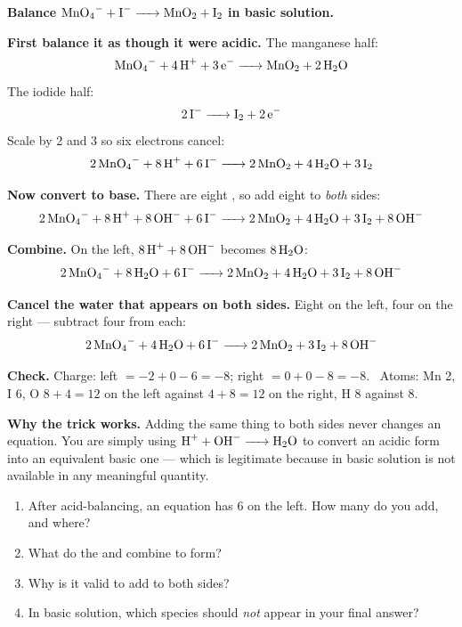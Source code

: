 \documentclass{apchem-worksheet}
\begin{document}
\begin{workedexample}
\textbf{Balance $\ce{MnO4- + I- -> MnO2 + I2}$ in basic solution.}

\textbf{First balance it as though it were acidic.} The manganese half:
\[ \ce{MnO4- + 4H+ + 3e- -> MnO2 + 2H2O} \]
The iodide half:
\[ \ce{2I- -> I2 + 2e-} \]
Scale by 2 and 3 so six electrons cancel:
\[ \ce{2MnO4- + 8H+ + 6I- -> 2MnO2 + 4H2O + 3I2} \]

\textbf{Now convert to base.} There are eight , so add eight
 to \emph{both} sides:
\[ \ce{2MnO4- + 8H+ + 8OH- + 6I- -> 2MnO2 + 4H2O + 3I2 + 8OH-} \]

\textbf{Combine.} On the left, $\ce{8H+ + 8OH-}$ becomes
$\ce{8H2O}$:
\[ \ce{2MnO4- + 8H2O + 6I- -> 2MnO2 + 4H2O + 3I2 + 8OH-} \]

\textbf{Cancel the water that appears on both sides.} Eight on the
left, four on the right --- subtract four from each:
\[ \ce{2MnO4- + 4H2O + 6I- -> 2MnO2 + 3I2 + 8OH-} \]

\textbf{Check.} Charge: left $= -2 + 0 - 6 = -8$; right $= 0 + 0 - 8 =
-8$. \checkmark\ Atoms: Mn 2, I 6, O $8+4 = 12$ on the left against
$4 + 8 = 12$ on the right, H 8 against 8. \checkmark

\textbf{Why the trick works.} Adding the same thing to both sides never
changes an equation. You are simply using $\ce{H+ + OH- -> H2O}$ to
convert an acidic form into an equivalent basic one --- which is
legitimate because in basic solution  is not available in any
meaningful quantity.
\end{workedexample}

\begin{yourturn}
\begin{enumerate}[leftmargin=*,itemsep=0.5em]
  \item After acid-balancing, an equation has 6  on the left.
        How many  do you add, and where?
        \workspace[1.6cm]
  \item What do the  and  combine to form?
        \workspace[1.4cm]
  \item Why is it valid to add  to both sides?
        \workspace[1.6cm]
  \item In basic solution, which species should \emph{not} appear in
        your final answer? \workspace[1.4cm]
\end{enumerate}
\end{yourturn}
\end{document}
